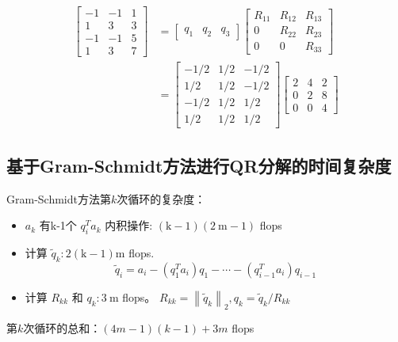 \begin{example}
$$
\begin{aligned}
\left[\begin{array}{rrr}
-1 & -1 & 1 \\
1 & 3 & 3 \\
-1 & -1 & 5 \\
1 & 3 & 7
\end{array}\right] &=\left[\begin{array}{lll}
q_{1} & q_{2} & q_{3}
\end{array}\right]\left[\begin{array}{ccc}
R_{11} & R_{12} & R_{13} \\
0 & R_{22} & R_{23} \\
0 & 0 & R_{33}
\end{array}\right] \\
&=\left[\begin{array}{rrr}
-1 / 2 & 1 / 2 & -1 / 2 \\
1 / 2 & 1 / 2 & -1 / 2 \\
-1 / 2 & 1 / 2 & 1 / 2 \\
1 / 2 & 1 / 2 & 1 / 2
\end{array}\right]\left[\begin{array}{rrr}
2 & 4 & 2 \\
0 & 2 & 8 \\
0 & 0 & 4
\end{array}\right]
\end{aligned}
$$
\end{example}

\subsection{基于Gram-Schmidt方法进行QR分解的时间复杂度}

Gram-Schmidt方法第$k$次循环的复杂度：

\begin{itemize}
    \item $ a_{k} $ 有k-1个 $ q_{i}^{T} a_{k} $ 内积操作: $ (\mathrm{k}-1)(2 \mathrm{~m}-1) $ flops
    \item 计算 $ \tilde{q}_{k}: 2(\mathrm{k}-1) \mathrm{m} $ flops. $$ \widetilde{q}_{i}=a_{i}-\left(q_{1}^{T} a_{i}\right) q_{1}-\cdots-\left(q_{i-1}^{T} a_{i}\right) q_{i-1} $$
    \item 计算 $ R_{k k} $ 和 $ q_{k}: 3 \mathrm{~m} $ flops。 $  R_{k k}=\left\|\tilde{q}_{k}\right\|_{2}, q_{k}=\tilde{q}_{k} / R_{k k} $
\end{itemize}

第$k$次循环的总和：$(4m-1)(k-1)+3m$ flops

